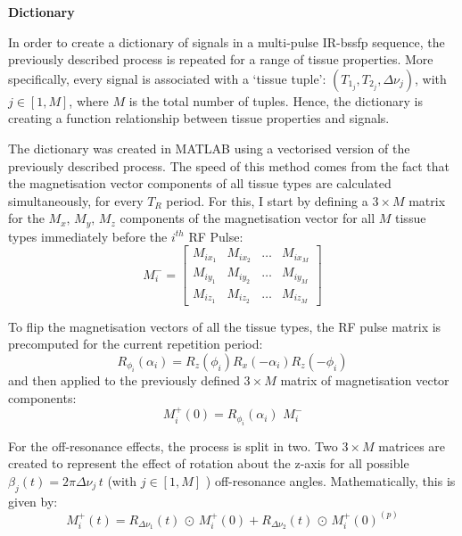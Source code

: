 \large \textbf{Dictionary} \normalsize

In order to create a dictionary of signals in a multi-pulse IR-\ac{bssfp} sequence, the previously described process is repeated for a range of tissue properties.
More specifically, every signal is associated with a `tissue tuple':
$(T_{1_j}, T_{2_j}, \Delta \nu_{j})$, with $j \in [1, M]$, where $M$ is the total number of tuples.
Hence, the dictionary is creating a function relationship between tissue properties and signals.

\hfill

The dictionary was created in MATLAB using a vectorised version of the previously described process.
The speed of this method comes from the fact that the magnetisation vector components of all tissue types are calculated simultaneously, for every $T_R$ period.
For this, I start by defining a $3 \times M$ matrix for the $M_x, \, M_y, \, M_z$ components of the magnetisation vector for all $M$ tissue types immediately before the $i^{th}$ RF Pulse:
\begin{equation}
    M^{-}_i = 
    \begin{bmatrix}
        M_{ix_1} & M_{ix_2} & \dots & M_{ix_M} \\
        M_{iy_1} & M_{iy_2} & \dots & M_{iy_M} \\
        M_{iz_1} & M_{iz_2} & \dots & M_{iz_M}
    \end{bmatrix}
\end{equation}

To flip the magnetisation vectors of all the tissue types, the RF pulse matrix is precomputed for the current repetition period:
\begin{equation}
        R_{\phi_i}(\alpha_i) = R_{z}(\phi_i) R_{x}(-\alpha_i) R_{z}(-\phi_i)
\end{equation}
and then applied to the previously defined $3 \times M$ matrix of magnetisation vector components:
\begin{equation}
    M^{+}_i(0) = R_{\phi_i}(\alpha_i) \, \, M^{-}_i
\end{equation}

For the off-resonance effects, the process is split in two.
Two $3 \times M$ matrices are created to represent the effect of rotation about the z-axis for all possible $\beta_j(t) = 2\pi \Delta \nu_j \, t$ \big(with $j \in [1, M]$ \big) off-resonance angles.
Mathematically, this is given by:
\begin{equation}
    M^{+}_i (t) = R_{\Delta \nu_1}(t) \, \odot \, M^{+}_i(0) + R_{\Delta \nu_2}(t)  \, \odot \, M^{+}_i(0)^{(p)}
\end{equation}

